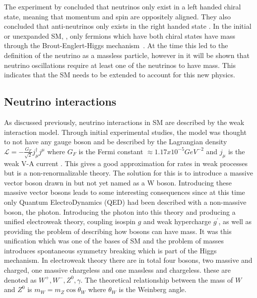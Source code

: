 The experiment by \citeauthor{1Helicity} concluded that neutrinos only exist in a left handed chiral state, meaning that momentum and spin are oppositely aligned. They also concluded that anti-neutrinos only exists in the right handed state \cite{1Helicity}. In the initial or unexpanded SM, \cite{34doi:10.1142/9789812562203_0002}, only fermions which have both chiral states have mass through the Brout\hyp{}Englert\hyp{}Higgs mechanism~\cite{35Higgs}. At the time this led to the definition of the neutrino as a massless particle, however in  it will be shown that neutrino oscillations require at least one of the neutrinos to have mass. This indicates that the SM needs to be extended to account for this new physics.

\subsection{Neutrino interactions}\label{subsection:Neutrino interactions}

As discussed previously, neutrino interactions in SM are described by the weak interaction model. Through initial experimental studies, the model was thought to not have any gauge boson and be described by the Lagrangian density $\mathscr{L} = -\frac{G_F}{\sqrt{2}} j_\mu ^\dagger j^\mu$ where $G_F$ is the Fermi constant $\approx 1.17 x 10^{-5} GeV^{-2}$ and $j_\mu$ is the weak V-A current \cite{47Soler}. This gives a good approximation for rates in weak processes but is a non-renormalizable theory. The solution for this is to introduce a massive vector boson drawn in  but not yet named as a W boson. Introducing these massive vector bosons leads to some interesting consequences since at this time only Quantum ElectroDynamics (QED) had been described with a non-massive boson, the photon. Introducing the photon into this theory and producing a unified electroweak theory, coupling isospin $g$ and weak hypercharge $g^\prime$, as well as providing the problem of describing how bosons can have mass. It was this unification which was one of the bases of SM and the problem of masses introduces spontaneous symmetry breaking which is part of the Higgs mechanism. In electroweak theory there are in total four bosons, two massive and charged, one massive chargeless and one massless and chargeless. these are denoted as $W^+, W^-, Z^0, \gamma$. The theoretical relationship between the mass of $W$ and $Z^0$ is $m_W = m_Z \cos \theta_W$ where $\theta_W$ is the Weinberg angle.

